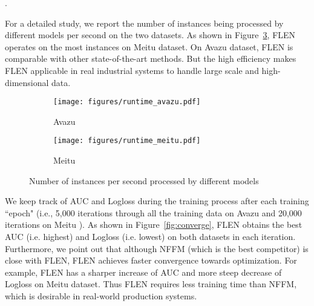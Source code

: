 \documentclass[sigconf]{acmart}
\begin{document}
\begin{table}[!htbp]
\centering\caption{Model complexity and parameter size in Avazu dataset for different models}. 
\end{table}

For a detailed study, we report the number of instances being processed by different models per second on the two datasets.  
As shown in Figure~\ref{fig:runtime}, FLEN operates on the most instances on Meitu dataset. On Avazu dataset, FLEN is comparable with other state-of-the-art methods. 
But the high efficiency makes FLEN applicable in real industrial systems to handle large scale and high-dimensional data.

\begin{figure}[ht]
	\centering
	\begin{subfigure}[b]{\columnwidth}
		\centering
		\texttt{[image: figures/runtime\_avazu.pdf]}
		\caption{Avazu}
		\label{fig:runtimeavazu}
	\end{subfigure} \hspace{-7pt}
	\begin{subfigure}[b]{\columnwidth}
		\centering
		\texttt{[image: figures/runtime\_meitu.pdf]}
		\caption{Meitu}
		\label{fig:runtimemeitu}
	\end{subfigure}  \hspace{-7pt}
	\caption{Number of instances per second processed by different models }
	\label{fig:runtime}
\end{figure}

We keep track of AUC and Logloss during the training process after each training ``epoch" (i.e., 5,000 iterations through all the training data on Avazu and 20,000 iterations on Meitu ).
As shown in Figure~\ref{fig:converge}, FLEN obtains the best AUC (i.e. highest) and Logloss (i.e. lowest) on both datasets in each iteration. 
Furthermore, we point out that although NFFM (which is the best competitor) is close with FLEN, FLEN achieves faster convergence towards optimization. For example, FLEN has a sharper increase of AUC and more steep decrease of Logloss on Meitu dataset. 
Thus FLEN requires less training time than NFFM, which is desirable in real-world production systems. 
\end{document}
